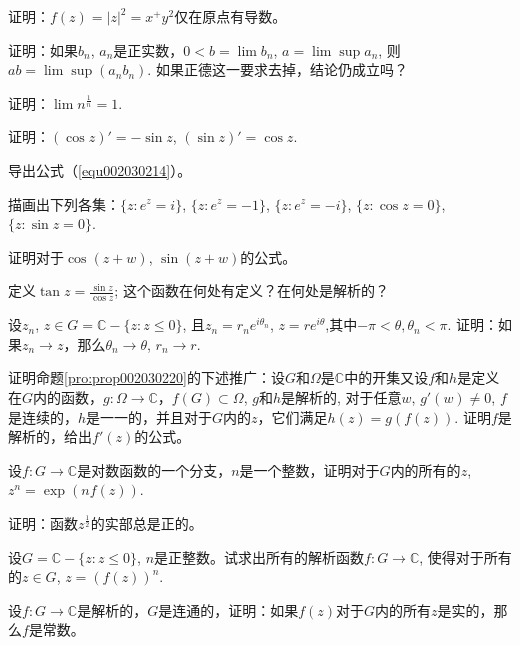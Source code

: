 \begin{problemset}
\item 证明：$f(z) = |z|^2 = x^ + y^2$仅在原点有导数。

\item\label{exer002030202}证明：如果$b_n$, $a_n$是正实数，$0 < b = \lim{b_n}$, $a = \lim\sup{a_n}$, 则$ab = \lim\sup{(a_nb_n)}$. 如果正德这一要求去掉，结论仍成立吗？

\item 证明：$\lim{n^{\frac{1}{n}}} = 1$.

\item 证明：$(\cos{z})' = -\sin{z}$, $(\sin{z})' = \cos{z}$.

\item 导出公式（\ref{equ002030214}）。

\item 描画出下列各集：$\{z:e^z = i\}$, $\{z:e^z=-1\}$, $\{z:e^z=-i\}$, $\{z:\cos{z}=0\}$, $\{z:\sin{z}=0\}$.

\item 证明对于$\cos{(z+w)}$, $\sin{(z+w)}$的公式。

\item 定义$\tan{z} = \frac{\sin{z}}{\cos{z}}$; 这个函数在何处有定义？在何处是解析的？

\item\label{exer002030209}设$z_n$, $z \in G= \mathbb{C} - \{z: z \le 0\}$, 且$z_n = r_ne^{i\theta_n}$, $z = re^{i\theta}$,其中$-\pi < \theta, \theta_n < \pi$. 证明：如果$z_n \to z$，那么$\theta_n \to \theta$, $r_n \to r$.

\item 证明命题\ref{pro:prop002030220}的下述推广：设$G$和$\Omega$是$\mathbb{C}$中的开集又设$f$和$h$是定义在$G$内的函数，$g: \Omega \to \mathbb{C}$，$f(G) \subset \Omega$, $g$和$h$是解析的, 对于任意$w$, $g'(w) \neq 0$, $f$是连续的，$h$是一一的，并且对于$G$内的$z$，它们满足$h(z) = g(f(z))$. 证明$f$是解析的，给出$f'(z)$的公式。

\item 设$f:G \to \mathbb{C}$是对数函数的一个分支，$n$是一个整数，证明对于$G$内的所有的$z$, $z^n = \exp{(nf(z))}$.

\item 证明：函数$z^{\frac{1}{2}}$的实部总是正的。

\item 设$G = \mathbb{C} - \{z:z \le 0\}$, $n$是正整数。试求出所有的解析函数$f:G \to \mathbb{C}$, 使得对于所有的$z \in G$, $z = (f(z))^n$.

\item\label{exer002030214}设$f: G \to \mathbb{C}$是解析的，$G$是连通的，证明：如果$f(z)$对于$G$内的所有$z$是实的，那么$f$是常数。


\end{problemset}
